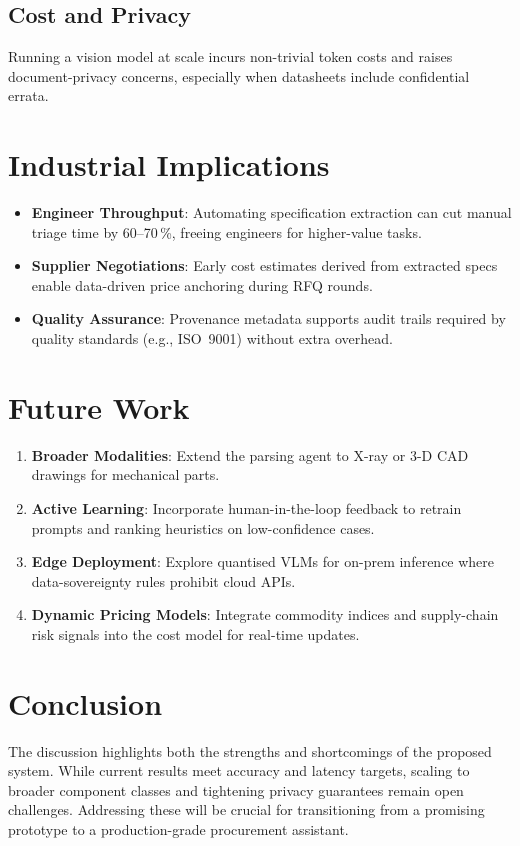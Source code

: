 \subsection{Cost and Privacy}
Running a vision model at scale incurs non-trivial token costs and raises document-privacy concerns, especially when datasheets include confidential errata.

\section{Industrial Implications}
\begin{itemize}
  \item \textbf{Engineer Throughput}: Automating specification extraction can cut manual triage time by \mbox{60–70\,\%}, freeing engineers for higher-value tasks.
  \item \textbf{Supplier Negotiations}: Early cost estimates derived from extracted specs enable data-driven price anchoring during RFQ rounds.
  \item \textbf{Quality Assurance}: Provenance metadata supports audit trails required by quality standards (e.g., ISO~9001) without extra overhead.
\end{itemize}

\section{Future Work}
\begin{enumerate}
  \item \textbf{Broader Modalities}: Extend the parsing agent to X-ray or 3-D CAD drawings for mechanical parts.
  \item \textbf{Active Learning}: Incorporate human-in-the-loop feedback to retrain prompts and ranking heuristics on low-confidence cases.
  \item \textbf{Edge Deployment}: Explore quantised VLMs for on-prem inference where data-sovereignty rules prohibit cloud APIs.
  \item \textbf{Dynamic Pricing Models}: Integrate commodity indices and supply-chain risk signals into the cost model for real-time updates.
\end{enumerate}

\section{Conclusion}
The discussion highlights both the strengths and shortcomings of the proposed system.  While current results meet accuracy and latency targets, scaling to broader component classes and tightening privacy guarantees remain open challenges.  Addressing these will be crucial for transitioning from a promising prototype to a production-grade procurement assistant.